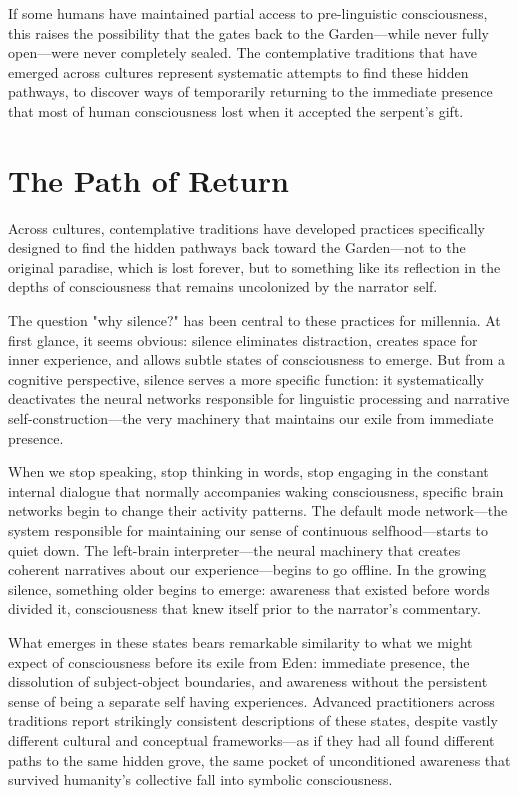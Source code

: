 If some humans have maintained partial access to pre-linguistic consciousness, this raises the possibility that the gates back to the Garden—while never fully open—were never completely sealed. The contemplative traditions that have emerged across cultures represent systematic attempts to find these hidden pathways, to discover ways of temporarily returning to the immediate presence that most of human consciousness lost when it accepted the serpent's gift. \section{The Path of Return}

Across cultures, contemplative traditions have developed practices specifically designed to find the hidden pathways back toward the Garden—not to the original paradise, which is lost forever, but to something like its reflection in the depths of consciousness that remains uncolonized by the narrator self.

The question "why silence?" has been central to these practices for millennia. At first glance, it seems obvious: silence eliminates distraction, creates space for inner experience, and allows subtle states of consciousness to emerge. But from a cognitive perspective, silence serves a more specific function: it systematically deactivates the neural networks responsible for linguistic processing and narrative self-construction—the very machinery that maintains our exile from immediate presence.

When we stop speaking, stop thinking in words, stop engaging in the constant internal dialogue that normally accompanies waking consciousness, specific brain networks begin to change their activity patterns. The default mode network—the system responsible for maintaining our sense of continuous selfhood—starts to quiet down. The left-brain interpreter—the neural machinery that creates coherent narratives about our experience—begins to go offline. In the growing silence, something older begins to emerge: awareness that existed before words divided it, consciousness that knew itself prior to the narrator's commentary.

What emerges in these states bears remarkable similarity to what we might expect of consciousness before its exile from Eden: immediate presence, the dissolution of subject-object boundaries, and awareness without the persistent sense of being a separate self having experiences. Advanced practitioners across traditions report strikingly consistent descriptions of these states, despite vastly different cultural and conceptual frameworks—as if they had all found different paths to the same hidden grove, the same pocket of unconditioned awareness that survived humanity's collective fall into symbolic consciousness.

